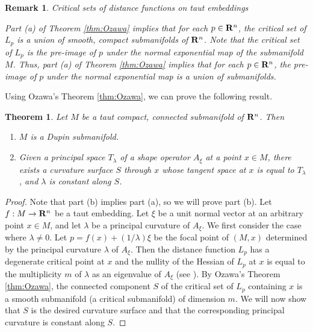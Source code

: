 \documentclass[12pt]{article}
\newtheorem{theorem}{Theorem}[section]
\newtheorem{remark}{Remark}[section]
\begin{document}
{\begin{remark}{Critical sets of distance functions on taut embeddings}
\label{ozawa-critical-set}

\noindent
{\rm Part (a) of Theorem \ref{thm:Ozawa} implies that for each $p \in {\bf R}^n$, the critical set of $L_p$ is a union of smooth, compact submanifolds of ${\bf R}^n$.
Note that the critical set of $L_p$ is the pre-image of $p$ under the normal exponential map of the submanifold $M$.  Thus, part (a) of Theorem \ref{thm:Ozawa} implies that
for each $p \in {\bf R}^n$, the pre-image of $p$ under the normal exponential map is a union of submanifolds.}
\end{remark}



Using Ozawa's Theorem \ref{thm:Ozawa}, we can prove the following result.

\begin{theorem}
\label{thm:taut-implies-semi-Dupin}
Let $M$ be a taut compact, connected submanifold of ${\bf R}^n$.
Then
\begin{enumerate}
\item[${\rm(a)}$] $M$ is a Dupin submanifold.
\item[${\rm(b)}$]  Given a principal space $T_{\lambda}$ of a shape operator
$A_{\xi}$ at a point $x \in M$, there exists a curvature
surface $S$ through $x$ whose tangent space at $x$ is equal to
$T_{\lambda}$, and $\lambda$ is constant along $S$.
\end{enumerate}
\end{theorem}

\begin{proof}
Note that part (b) implies part (a), so we will prove part (b).
Let $f:M \rightarrow {\bf R}^n$ be a taut embedding.
Let $\xi$ be a unit normal vector at an arbitrary
point $x \in M$, and let $\lambda$ be a principal curvature of
$A_{\xi}$.  We first consider the case where $\lambda \neq 0$. Let $p = f(x) + (1/ \lambda)\xi$ be the focal point
of $(M,x)$ determined by the principal curvature $\lambda$ of $A_{\xi}$.
Then the distance function $L_p$ has a degenerate critical point at $x$
and the nullity of the Hessian of $L_p$ at $x$ is equal to the
multiplicity $m$ of $\lambda$ as an eigenvalue of $A_{\xi}$ 
(see \cite[p. 36]{Mil}).  By Ozawa's Theorem \ref{thm:Ozawa}, the connected
component $S$ of the critical set of $L_p$ containing $x$ is
a smooth submanifold (a critical submanifold) of dimension $m$.  We will now show that $S$
is the desired curvature surface and that the corresponding
principal curvature is constant along $S$.


\end{proof}}
\end{document}
